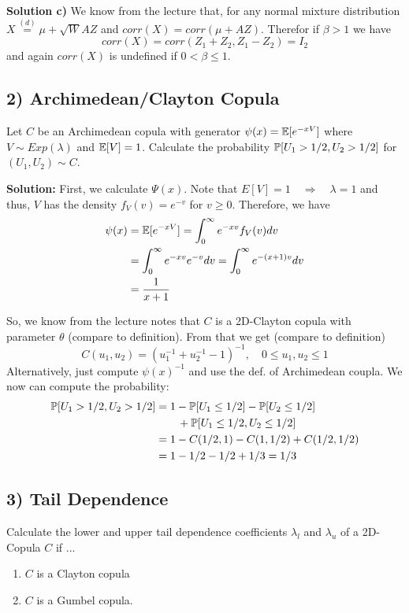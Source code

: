 \textbf{Solution c)} We know from the lecture that, for any normal mixture distribution $X \overset{(d)}{=} \mu + \sqrt{W}AZ$ and $corr(X) = corr(\mu + AZ)$. Therefor if $\beta > 1$ we have
\[
    corr(X) = corr(Z_1 + Z_2, Z_1 - Z_2) = I_2
\]
and again $corr(X)$ is undefined if $0 < \beta \leq 1$.


%
%
\subsection*{2) Archimedean/Clayton Copula}
Let $C$ be an Archimedean copula with generator $\psi(x) = \mathbb{E}[e^{-xV}]$ where $V \sim Exp(\lambda)$ and $\mathbb{E}[V] = 1$. Calculate the probability $\mathbb{P}[U_1 > 1/2, U_2 > 1/2]$ for $(U_1, U_2) \sim C$.

\textbf{Solution:} First, we calculate $\Psi(x)$. Note that $E[V] = 1 \quad \Rightarrow \quad \lambda = 1$ and thus, $V$ has the density $f_V(v) = e^{-v}$ for $v \geq 0$. Therefore, we have
\begin{align*}
    \psi(x) &= \mathbb{E}[e^{-xV}] = \int_0^\infty e^{-xv}f_V(v)dv \\
            &= \int_0^\infty e^{-xv}e^{-v} dv = \int_0^\infty e^{-(x+1)v}dv \\
            &= \frac{1}{x+1}
\end{align*}

So, we know from the lecture notes that $C$ is a 2D-Clayton copula with parameter $\theta$ (compare to definition). From that we get (compare to definition)
\[
    C(u_1, u_2) = (u_1^{-1} + u_2^{-1} - 1)^{-1}, \quad 0\leq u_1, u_2 \leq 1
\]
Alternatively, just compute $\psi(x)^{-1}$ and use the def. of Archimedean coupla.
We now can compute the probability:
\begin{align*}
    \mathbb{P}[U_1 > 1/2, U_2 > 1/2] &= 1 - \mathbb{P}[U_1 \leq 1/2] - \mathbb{P}[U_2 \leq 1/2] \\
    &\quad \ \ \ + \mathbb{P}[U_1 \leq 1/2, U_2 \leq 1/2] \\
    &= 1 - C(1/2, 1) - C(1, 1/2) + C(1/2, 1/2) \\
    &= 1 - 1/2 - 1/2 + 1/3 = 1/3
\end{align*}

%
%
\subsection*{3) Tail Dependence}
Calculate the lower and upper tail dependence coefficients $\lambda_l$ and $\lambda_u$ of a 2D-Copula $C$ if ...
\begin{enumerate}[label=(\alph*)]
    \item $C$ is a Clayton copula
    \item $C$ is a Gumbel copula.
\end{enumerate}

